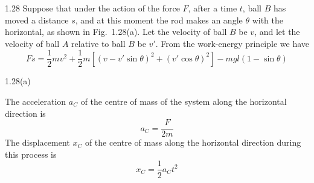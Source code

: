 \begin{solution}{1.28}
Suppose that under the action of the force $F$, after a time $t$, ball $B$ has moved a distance $s$, and at this moment the rod makes an angle $\theta$ with the horizontal, as shown in Fig.~1.28(a). Let the velocity of ball $B$ be $v$, and let the velocity of ball $A$ relative to ball $B$ be $v'$. From the work-energy principle we have
\begin{equation}
Fs=\frac{1}{2}mv^2+\frac{1}{2}m\left[(v-v'\sin\theta)^2+(v'\cos\theta)^2\right]-mgl(1-\sin\theta) \tag{1}
\end{equation}
\begin{figbox}{1.28(a)}
\end{figbox}

The acceleration $a_C$ of the centre of mass of the system along the horizontal direction is
\begin{equation}
a_C=\frac{F}{2m} \tag{2}
\end{equation}
The displacement $x_C$ of the centre of mass along the horizontal direction during this process is
\begin{equation}
x_C=\frac{1}{2}a_Ct^2 \tag{3}
\end{equation}


\end{solution}
